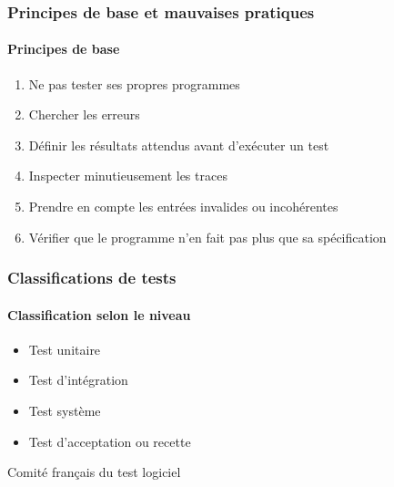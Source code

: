 \documentclass{beamer}
\begin{document}
\begin{frame}
	\frametitle{Principes de base et mauvaises pratiques}
	\framesubtitle{Principes de base}
	
		\begin{enumerate}
			\item Ne pas tester ses propres programmes
			\item Chercher les erreurs
			\item D\'{e}finir les r\'{e}sultats  attendus avant d'ex\'{e}cuter un test
			\item Inspecter minutieusement les traces
			\item Prendre en compte les entr\'{e}es invalides ou incoh\'{e}rentes
			\item V\'{e}rifier que le programme n'en fait pas plus que sa sp\'{e}cification
		\end{enumerate}
\end{frame}


\begin{frame}
	\frametitle{Classifications de tests}
	\framesubtitle{Classification selon le niveau}
		\begin{itemize}
			\item Test unitaire
			\item Test d'int\'{e}gration
			\item Test syst\`{e}me
			\item Test d'acceptation ou recette
		\end{itemize}
		
		\tiny{Comit\'{e} fran\c{c}ais du test logiciel}
\end{frame}
\end{document}
